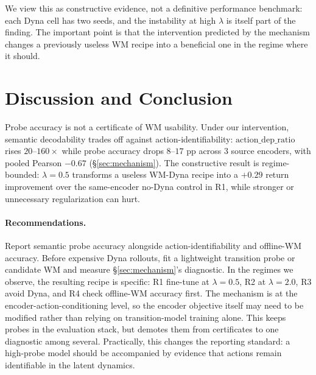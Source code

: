 \documentclass{article}
\begin{document}
We view this as constructive evidence, not a definitive performance benchmark: each Dyna cell has two seeds, and the instability at high $\lambda$ is itself part of the finding. The important point is that the intervention predicted by the mechanism changes a previously useless WM recipe into a beneficial one in the regime where it should.

\section{Discussion and Conclusion}

Probe accuracy is not a certificate of WM usability. Under our intervention, semantic decodability trades off against action-identifiability: $\mathrm{action\_dep\_ratio}$ rises $20$--$160\times$ while probe accuracy drops $8$--$17$ pp across $3$ source encoders, with pooled Pearson $-0.67$ (\S\ref{sec:mechanism}). The constructive result is regime-bounded: $\lambda{=}0.5$ transforms a useless WM-Dyna recipe into a $+0.29$ return improvement over the same-encoder no-Dyna control in R1, while stronger or unnecessary regularization can hurt.

\paragraph{Recommendations.} Report semantic probe accuracy alongside action-identifiability and offline-WM accuracy. Before expensive Dyna rollouts, fit a lightweight transition probe or candidate WM and measure \S\ref{sec:mechanism}'s diagnostic. In the regimes we observe, the resulting recipe is specific: R1 fine-tune at $\lambda{=}0.5$, R2 at $\lambda{=}2.0$, R3 avoid Dyna, and R4 check offline-WM accuracy first. The mechanism is at the encoder-action-conditioning level, so the encoder objective itself may need to be modified rather than relying on transition-model training alone. This keeps probes in the evaluation stack, but demotes them from certificates to one diagnostic among several. Practically, this changes the reporting standard: a high-probe model should be accompanied by evidence that actions remain identifiable in the latent dynamics.
\end{document}
